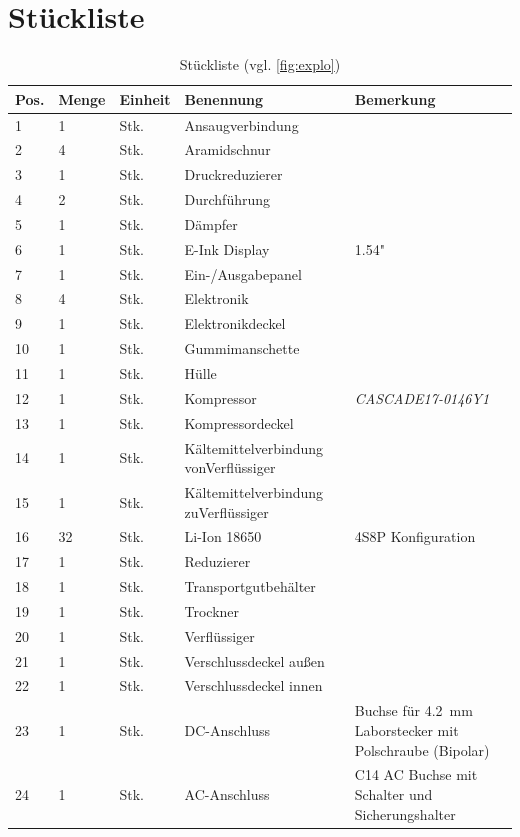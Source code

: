 	\section{Stückliste}
		\begin{table}[h]
			\centering
			\caption{Stückliste (vgl. \cref{fig:explo})}
			\begin{tabular}[c]{@{}p{}p{}p{}p{.35\textwidth}p{}@{}}
				\toprule
				Pos. & Menge & Einheit & Benennung & Bemerkung\\
				\midrule
				1&1&Stk.&Ansaugverbindung& \\
				2&4&Stk.&Aramidschnur& \\
				3&1&Stk.&Druckreduzierer& \\
				4&2&Stk.&Durchführung&\\
				5&1&Stk.&Dämpfer&\\
				6&1&Stk.&E-Ink Display&1.54"\\
				7&1&Stk.&Ein-/Ausgabepanel& \\
				8&4&Stk.&Elektronik& \\
				9&1&Stk.&Elektronikdeckel& \\
				10&1&Stk.&Gummimanschette& \\
				11&1&Stk.&Hülle&\\
				12&1&Stk.&Kompressor&\textit{CASCADE17-0146Y1}\\
				13&1&Stk.&Kompressordeckel& \\
				14&1&Stk.&Kältemittelverbindung von\newline Verflüssiger& \\
				15&1&Stk.&Kältemittelverbindung zu\newline Verflüssiger& \\
				16&32&Stk.&Li-Ion 18650&4S8P Konfiguration\\
				17&1&Stk.&Reduzierer& \\
				18&1&Stk.&Transportgutbehälter&\\
				19&1&Stk.&Trockner&\\
				20&1&Stk.&Verflüssiger&\\
				21&1&Stk.&Verschlussdeckel außen&\\
				22&1&Stk.&Verschlussdeckel innen&\\
				23&1&Stk.&DC-Anschluss&Buchse für \SI{4,2}{mm} Laborstecker mit Polschraube (Bipolar)\\
				24&1&Stk.&AC-Anschluss&C14 AC Buchse mit Schalter und Sicherungshalter\\
				\bottomrule
			\end{tabular}
			\label{tab:stueckliste}
		\end{table}